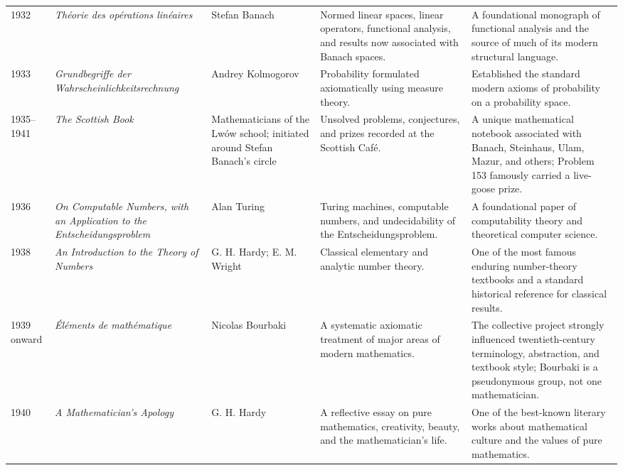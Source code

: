 {\begin{longtable}{@{}L{0.08\textwidth}L{0.21\textwidth}L{0.15\textwidth}L{0.22\textwidth}L{0.26\textwidth}@{}}
        1932
        & \textit{Th\'eorie des op\'erations lin\'eaires}
        & Stefan Banach
        & Normed linear spaces, linear operators, functional analysis, and results now associated with Banach spaces.
        & A foundational monograph of functional analysis and the source of much of its modern structural language. \\

        1933
        & \textit{Grundbegriffe der Wahrscheinlichkeitsrechnung}
        & Andrey Kolmogorov
        & Probability formulated axiomatically using measure theory.
        & Established the standard modern axioms of probability on a probability space. \\

        1935--1941
        & \textit{The Scottish Book}
        & Mathematicians of the Lw\'ow school; initiated around Stefan Banach's circle
        & Unsolved problems, conjectures, and prizes recorded at the Scottish Caf\'e.
        & A unique mathematical notebook associated with Banach, Steinhaus, Ulam, Mazur, and others; Problem 153 famously carried a live-goose prize. \\

        1936
        & \textit{On Computable Numbers, with an Application to the Entscheidungsproblem}
        & Alan Turing
        & Turing machines, computable numbers, and undecidability of the Entscheidungsproblem.
        & A foundational paper of computability theory and theoretical computer science. \\

        1938
        & \textit{An Introduction to the Theory of Numbers}
        & G. H. Hardy; E. M. Wright
        & Classical elementary and analytic number theory.
        & One of the most famous enduring number-theory textbooks and a standard historical reference for classical results. \\

        1939 onward
        & \textit{\'El\'ements de math\'ematique}
        & Nicolas Bourbaki
        & A systematic axiomatic treatment of major areas of modern mathematics.
        & The collective project strongly influenced twentieth-century terminology, abstraction, and textbook style; Bourbaki is a pseudonymous group, not one mathematician. \\

        1940
        & \textit{A Mathematician's Apology}
        & G. H. Hardy
        & A reflective essay on pure mathematics, creativity, beauty, and the mathematician's life.
        & One of the best-known literary works about mathematical culture and the values of pure mathematics. \\


\end{longtable}}

